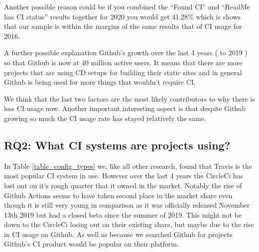 \documentclass[10pt,conference]{IEEEtran}
\begin{document}
Another possible reason could be if you combined the \enquote{Found CI} and \enquote{ReadMe has CI status} results together for 2020 you would get 41.28\% which is shows that our sample is within the margins of the same results that of CI usage for 2016.

A further possible explanation Github's growth over the last 4 years (\citet{GithubOctoverseResults2016} to 2019 \citet{GithubOctoverseResults}) so that Github is now at 40 million active users. It means that there are more projects that are using CD setups for building their static sites and in general Github is being used for more things that wouldn't require CI.

We think that the last two factors are the most likely contributors to why there is less CI usage now. Another important interesting aspect is that despite Github growing so much the CI usage rate has stayed relatively the same. 




\vspace*{-0.05in}
\subsection{\textbf{RQ2}: What CI systems are projects using?}
\label{section:RQ2}
\vspace*{-0.05in}
In Table \ref{table_config_types} we, like all other research, found that Travis is the most popular CI system in use. However over the last 4 years the \cite{Github2017} CircleCi has lost out on it's rough quarter that it owned in the market. Notably the rise of Github Actions seems to have taken second place in the market share even though it is still very young in comparison as it was officially released November 13th 2019 but had a closed beta since the summer of 2019. This might not be down to the CircleCi losing out on their existing share, but maybe due to the rise in CI usage on Github. As well as because we searched Github for projects Github's CI product would be popular on their platform.


\end{document}
